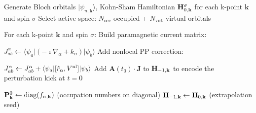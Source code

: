\begin{algorithm}[h!]
\caption{Periodic RT-TDDFT Algorithm (VECTOR\_POT mode)}
\label{alg:tddft-periodic}
\begin{algorithmic}[1]
\scriptsize

\item[{\bf /* Ground state DFT calculations: */}]
\State Generate Bloch orbitals $|\psi_{n,\mathbf{k}}\rangle$,
       Kohn-Sham Hamiltonian $\vb{H}^\sigma_{0,\mathbf{k}}$
       for each k-point $\mathbf{k}$ and spin $\sigma$
\State Select active space: $N_{\mathrm{occ}}$ occupied +
       $N_{\mathrm{virt}}$ virtual orbitals
\item[]

\item[{\bf /* Build current operator matrices (once, before time loop): */}]
\State For each k-point $\mathbf{k}$ and spin $\sigma$:
\State \quad Build paramagnetic current matrix:
\item[] \quad $J^\alpha_{ab} \leftarrow
         \langle\psi_a|(-\imath\nabla_\alpha + k_\alpha)|\psi_b\rangle$
       \quad [VecPHmatrix()]
\State \quad Add nonlocal PP correction:
\item[] \quad $J^\alpha_{ab} \leftarrow J^\alpha_{ab} +
         \langle\psi_a|[\hat{r}_\alpha, V^{\mathrm{nl}}]|\psi_b\rangle$
       \quad [CurrentNlpp()]
\State \quad Add $\mathbf{A}(t_0)\cdot\mathbf{J}$ to $\vb{H}_{-1,\mathbf{k}}$
       to encode the perturbation kick at $t=0$
\item[]

\item[{\bf /* Initialize density matrix: */}]
\State $\vb{P}^0_{\mathbf{k}} \leftarrow \mathrm{diag}(f_{n,\mathbf{k}})$
       \quad (occupation numbers on diagonal)
\State $\vb{H}_{-1,\mathbf{k}} \leftarrow \vb{H}_{0,\mathbf{k}}$
       (extrapolation seed)
\item[]


\end{algorithmic}
\end{algorithm}
